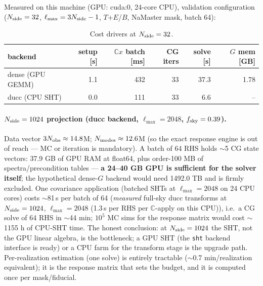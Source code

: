 
Measured on this machine (GPU: cuda:0, 24-core CPU), validation
configuration ($N_{\rm side}=32$, $\ell_{\max}=3N_{\rm side}-1$,
$T$+$E$/$B$, NaMaster mask, batch 64):

\begin{table}[h]\centering\small
\begin{tabular}{lrrrrr}
\toprule
backend & setup [s] & $\mathbb{C}x$ batch [ms] & CG iters & solve [s] & $G$ mem [GB] \\
\midrule
dense (GPU GEMM) & 1.1 & 432 & 33 & 37.3 & 1.78 \\
ducc (CPU SHT)   & 0.0 & 111 & 33 & 6.6 & -- \\
\bottomrule
\end{tabular}
\caption{Cost drivers at $N_{\rm side}=32$.}
\end{table}

\paragraph{$N_{\rm side}=1024$ projection (ducc backend, $\ell_{\max}=2048$,
$f_{\rm sky}=0.39$).}
Data vector $3N_{\rm obs} \approx 14.8$M;
$N_{\rm modes} \approx 12.6$M (so the exact response
engine is out of reach --- MC or iteration is mandatory).
A batch of 64 RHS holds $\sim$5 CG state vectors:
37.9 GB of GPU RAM at float64, plus order-100 MB of
spectra/precondition tables --- \textbf{a 24--40 GB GPU is sufficient for
the solver itself}; the hypothetical dense-$G$ backend would need
1492.0 TB and is firmly excluded.
One covariance application (batched SHTs at $\ell_{\max}=2048$ on 24 CPU
cores) costs $\sim$81\,s per batch of
64 (\emph{measured} full-sky ducc transforms at $N_{\rm side}=1024$, $\ell_{\max}=2048$ (1.3\,s per RHS per $\mathbb{C}$-apply on this CPU)), i.e.\ a CG solve of 64 RHS in
$\sim$44 min; $10^5$ MC sims for the response matrix
would cost $\sim$1155 h of CPU-SHT
time.  The honest conclusion: at $N_{\rm side}=1024$ the SHT, not the GPU
linear algebra, is the bottleneck; a GPU SHT (the \texttt{sht} backend
interface is ready) or a CPU farm for the transform stage is the upgrade
path.  Per-realization estimation (one solve) is entirely tractable
($\sim$0.7 min/realization equivalent);
it is the response matrix that sets the budget, and it is computed once
per mask/fiducial.
